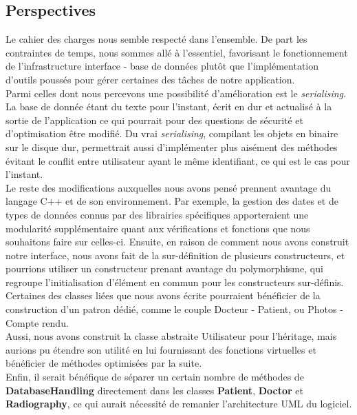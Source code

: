 \documentclass[12pt,a4paper]{article}
\begin{document}
\begin{multicols}{2}
				
		\section{Perspectives}
		
		Le cahier des charges nous semble respecté dans l'ensemble. De part les contraintes de temps, nous sommes allé à l'essentiel, favorisant le fonctionnement de l'infrastructure interface - base de données plutôt que l'implémentation d'outils poussés pour gérer certaines des tâches de notre application. \\
		
		Parmi celles dont nous percevons une possibilité d'amélioration est le \textit{serialising}. La base de donnée étant du texte pour l'instant, écrit en dur et actualisé à la sortie de l'application ce qui pourrait pour des questions de sécurité et d'optimisation être modifié. Du \og vrai\fg{} \textit{serialising}, compilant les objets en binaire sur le disque dur, permettrait aussi d'implémenter plus aisément des méthodes évitant le conflit entre utilisateur ayant le même identifiant, ce qui est le cas pour l'instant. \\
		
		Le reste des modifications auxquelles nous avons pensé prennent avantage du langage C++ et de son environnement. Par exemple, la gestion des dates et de types de données connus par des librairies spécifiques apporteraient une modularité supplémentaire quant aux vérifications et fonctions que nous souhaitons faire sur celles-ci. Ensuite, en raison de comment nous avons construit notre interface, nous avons fait de la sur-définition de plusieurs constructeurs, et pourrions utiliser un constructeur prenant avantage du polymorphisme, qui regroupe l'initialisation d'élément en commun pour les constructeurs sur-définis. Certaines des classes liées que nous avons écrite pourraient bénéficier de la construction d'un patron dédié, comme le couple Docteur - Patient, ou Photos - Compte rendu. \\
		
		Aussi, nous avons construit la classe abstraite Utilisateur pour l'héritage, mais aurions pu étendre son utilité en lui fournissant des fonctions virtuelles et bénéficier de méthodes optimisées par la suite. \\
		
		Enfin, il serait bénéfique de séparer un certain nombre de méthodes de \textbf{DatabaseHandling} directement dans les classes \textbf{Patient}, \textbf{Doctor} et \textbf{Radiography}, ce qui aurait nécessité de remanier l'architecture UML du logiciel.
		

\end{multicols}
\end{document}
